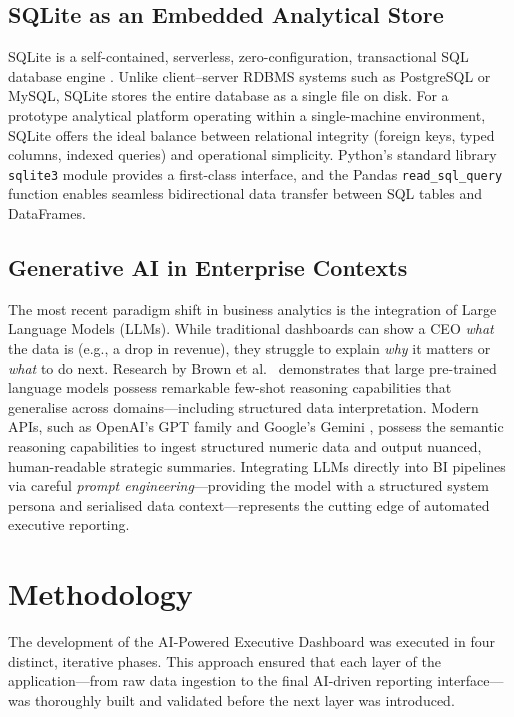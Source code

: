 \documentclass{book}
\begin{document}
\section{SQLite as an Embedded Analytical Store}
SQLite is a self-contained, serverless, zero-configuration, transactional SQL database engine \cite{sqlite_docs}. Unlike client--server RDBMS systems such as PostgreSQL or MySQL, SQLite stores the entire database as a single file on disk. For a prototype analytical platform operating within a single-machine environment, SQLite offers the ideal balance between relational integrity (foreign keys, typed columns, indexed queries) and operational simplicity. Python's standard library \texttt{sqlite3} module provides a first-class interface, and the Pandas \texttt{read\_sql\_query} function enables seamless bidirectional data transfer between SQL tables and DataFrames.

\section{Generative AI in Enterprise Contexts}
The most recent paradigm shift in business analytics is the integration of Large Language Models (LLMs). While traditional dashboards can show a CEO \textit{what} the data is (e.g., a drop in revenue), they struggle to explain \textit{why} it matters or \textit{what} to do next. Research by Brown et al.\ \cite{brown2020language} demonstrates that large pre-trained language models possess remarkable few-shot reasoning capabilities that generalise across domains---including structured data interpretation. Modern APIs, such as OpenAI's GPT family and Google's Gemini \cite{gemini_api}, possess the semantic reasoning capabilities to ingest structured numeric data and output nuanced, human-readable strategic summaries. Integrating LLMs directly into BI pipelines via careful \textit{prompt engineering}---providing the model with a structured system persona and serialised data context---represents the cutting edge of automated executive reporting.


\chapter{Methodology}

The development of the AI-Powered Executive Dashboard was executed in four distinct, iterative phases. This approach ensured that each layer of the application---from raw data ingestion to the final AI-driven reporting interface---was thoroughly built and validated before the next layer was introduced.
\end{document}
